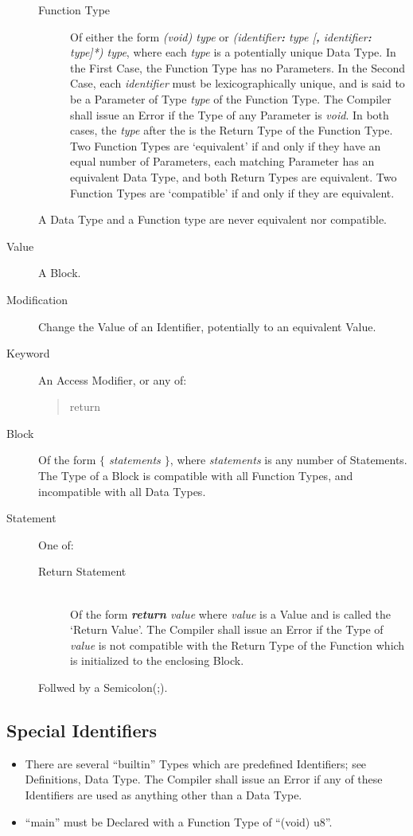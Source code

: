 \documentclass{article}
\begin{document}
\begin{description}
\begin{description}
		\item[Function Type] Of either the form \textit{(void) \ret type} or \textit{(identifier\textbf{:} type [\textbf{,} identifier\textbf{:} type]*) \ret type}, where each \textit{type} is a potentially unique Data Type. In the First Case, the Function Type has no Parameters. In the Second Case, each \textit{identifier} must be lexicographically unique, and is said to be a Parameter of Type \textit{type} of the Function Type. The Compiler shall issue an Error if the Type of any Parameter is \textit{void}. In both cases, the \textit{type} after the \textit{\ret} is the Return Type of the Function Type. Two Function Types are `equivalent' if and only if they have an equal number of Parameters, each matching Parameter has an equivalent Data Type, and both Return Types are equivalent. Two Function Types are `compatible' if and only if they are equivalent.
		\end{description}
		A Data Type and a Function type are never equivalent nor compatible.
	\item[Value] A Block.
	\item[Modification] Change the Value of an Identifier, potentially to an equivalent Value.
	\item[Keyword] An Access Modifier, or any of:
		\begin{quote}
		return
		\end{quote}
	\item[Block] Of the form \textit{\textbf{$\{$} statements \textbf{$\}$}}, where \textit{statements} is any number of Statements. The Type of a Block is compatible with all Function Types, and incompatible with all Data Types.
	\item[Statement] One of:
		\begin{description}
		\item[Return Statement] \hfill \\ Of the form \textit{\textbf{return} value} where \textit{value} is a Value and is called the `Return Value'. The Compiler shall issue an Error if the Type of \textit{value} is not compatible with the Return Type of the Function which is initialized to the enclosing Block.
		\end{description}
		Follwed by a Semicolon(;). 
	\end{description}
\subsection{Special Identifiers}
	\begin{itemize}
	\item[] There are several ``builtin'' Types which are predefined Identifiers; see Definitions, Data Type. The Compiler shall issue an Error if any of these Identifiers are used as anything other than a Data Type.
	\item[] ``main'' must be Declared with a Function Type of ``(void) \ret u8''. 
	\end{itemize}
\end{document}
